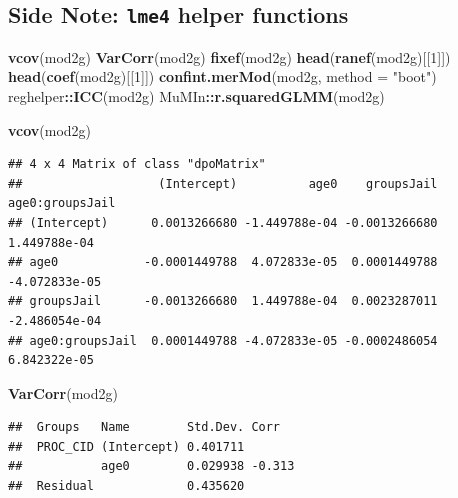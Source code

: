 \documentclass[]{article}
\newenvironment{Shaded}{\begin{snugshade}}{\end{snugshade}}
\newcommand{\KeywordTok}[1]{\textcolor[rgb]{0.13,0.29,0.53}{\textbf{#1}}}
\newcommand{\DataTypeTok}[1]{\textcolor[rgb]{0.13,0.29,0.53}{#1}}
\newcommand{\DecValTok}[1]{\textcolor[rgb]{0.00,0.00,0.81}{#1}}
\newcommand{\StringTok}[1]{\textcolor[rgb]{0.31,0.60,0.02}{#1}}
\newcommand{\OperatorTok}[1]{\textcolor[rgb]{0.81,0.36,0.00}{\textbf{#1}}}
\newcommand{\NormalTok}[1]{#1}
\begin{document}
\subsection{\texorpdfstring{Side Note: \texttt{lme4} helper
functions}{Side Note: lme4 helper functions}}\label{side-note-lme4-helper-functions}

\begin{Shaded}
\begin{Highlighting}[]
\KeywordTok{vcov}\NormalTok{(mod2g)}
\KeywordTok{VarCorr}\NormalTok{(mod2g)}
\KeywordTok{fixef}\NormalTok{(mod2g)}
\KeywordTok{head}\NormalTok{(}\KeywordTok{ranef}\NormalTok{(mod2g)[[}\DecValTok{1}\NormalTok{]])}
\KeywordTok{head}\NormalTok{(}\KeywordTok{coef}\NormalTok{(mod2g)[[}\DecValTok{1}\NormalTok{]])}
\KeywordTok{confint.merMod}\NormalTok{(mod2g, }\DataTypeTok{method =} \StringTok{"boot"}\NormalTok{)}
\NormalTok{reghelper}\OperatorTok{::}\KeywordTok{ICC}\NormalTok{(mod2g)}
\NormalTok{MuMIn}\OperatorTok{::}\KeywordTok{r.squaredGLMM}\NormalTok{(mod2g)}
\end{Highlighting}
\end{Shaded}

\small

\begin{Shaded}
\begin{Highlighting}[]
\KeywordTok{vcov}\NormalTok{(mod2g)}
\end{Highlighting}
\end{Shaded}

\begin{verbatim}
## 4 x 4 Matrix of class "dpoMatrix"
##                   (Intercept)          age0    groupsJail age0:groupsJail
## (Intercept)      0.0013266680 -1.449788e-04 -0.0013266680    1.449788e-04
## age0            -0.0001449788  4.072833e-05  0.0001449788   -4.072833e-05
## groupsJail      -0.0013266680  1.449788e-04  0.0023287011   -2.486054e-04
## age0:groupsJail  0.0001449788 -4.072833e-05 -0.0002486054    6.842322e-05
\end{verbatim}

\small

\begin{Shaded}
\begin{Highlighting}[]
\KeywordTok{VarCorr}\NormalTok{(mod2g)}
\end{Highlighting}
\end{Shaded}

\begin{verbatim}
##  Groups   Name        Std.Dev. Corr  
##  PROC_CID (Intercept) 0.401711       
##           age0        0.029938 -0.313
##  Residual             0.435620
\end{verbatim}
\end{document}
